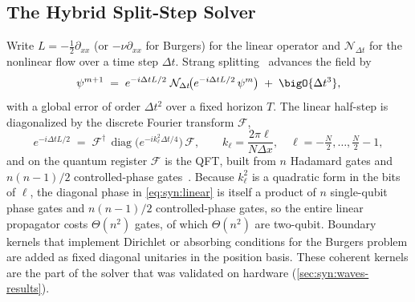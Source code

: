 \subsection{The Hybrid Split-Step Solver}\label{sec:syn:splitstep}

Write $L=-\tfrac12\partial_{xx}$ (or $-\nu\partial_{xx}$ for Burgers) for the linear operator and $\mathcal{N}_{\Delta t}$ for the nonlinear flow over a time step $\Delta t$. Strang splitting~\cite{strang1968splitting} advances the field by
\begin{equation}\label{eq:syn:strang}
  \psi^{m+1} \;=\; e^{-i\Delta t L/2}\;\mathcal{N}_{\Delta t}\!\big(e^{-i\Delta t L/2}\,\psi^{m}\big) \;+\;\bigO{\Delta t^{3}},
\end{equation}
with a global error of order $\Delta t^{2}$ over a fixed horizon $T$. The linear half-step is diagonalized by the discrete Fourier transform $\mathcal{F}$,
\begin{equation}\label{eq:syn:linear}
  e^{-i\Delta t L/2} \;=\; \mathcal{F}^{\dagger}\,\operatorname{diag}\!\big(e^{-i k_\ell^{2}\Delta t/4}\big)\,\mathcal{F},
  \qquad k_\ell=\frac{2\pi\ell}{N\Delta x},\quad \ell=-\tfrac{N}{2},\dots,\tfrac{N}{2}-1,
\end{equation}
and on the quantum register $\mathcal{F}$ is the QFT, built from $n$ Hadamard gates and $n(n-1)/2$ controlled-phase gates~\cite{nielsen2010qcqi}. Because $k_\ell^{2}$ is a quadratic form in the bits of $\ell$, the diagonal phase in \cref{eq:syn:linear} is itself a product of $n$ single-qubit phase gates and $n(n-1)/2$ controlled-phase gates, so the entire linear propagator costs $\Theta(n^{2})$ gates, of which $\Theta(n^{2})$ are two-qubit. Boundary kernels that implement Dirichlet or absorbing conditions for the Burgers problem are added as fixed diagonal unitaries in the position basis. These coherent kernels are the part of the solver that was validated on hardware (\cref{sec:syn:waves-results}).

